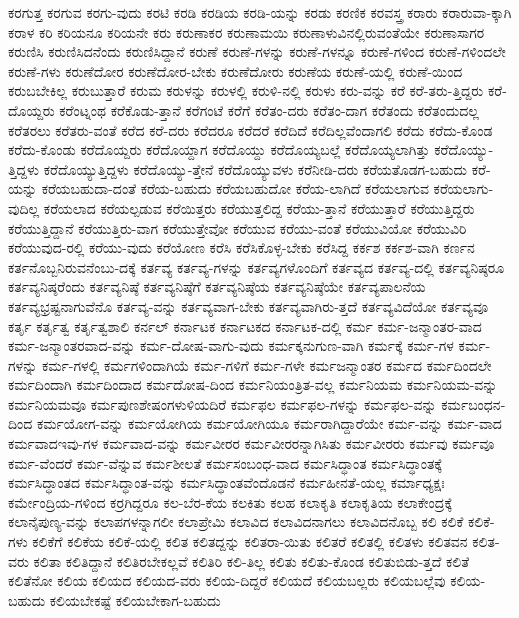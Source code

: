 {ಕರಗುತ್ತ
ಕರಗುವ
ಕರಗು-ವುದು
ಕರಟಿ
ಕರಡಿ
ಕರಡಿಯ
ಕರಡಿ-ಯನ್ನು
ಕರಡು
ಕರಣಿಕ
ಕರವಸ್ತ್ರ
ಕರಾರು
ಕರಾರುವಾ-ಕ್ಕಾಗಿ
ಕರಾಳ
ಕರಿ
ಕರಿಯನೂ
ಕರಿಯನೇ
ಕರು
ಕರುಣಾಕರ
ಕರುಣಾಮಯಿ
ಕರುಣಾಳುವಿನಲ್ಲಿರುವಂತೆಯೇ
ಕರುಣಾಸಾಗರ
ಕರುಣಿಸಿ
ಕರುಣಿಸಿದನೆಂದು
ಕರುಣಿಸಿದ್ದಾನೆ
ಕರುಣೆ
ಕರುಣೆ-ಗಳನ್ನು
ಕರುಣೆ-ಗಳನ್ನೂ
ಕರುಣೆ-ಗಳಿಂದ
ಕರುಣೆ-ಗಳಿಂದಲೇ
ಕರುಣೆ-ಗಳು
ಕರುಣೆದೋರ
ಕರುಣೆದೋರ-ಬೇಕು
ಕರುಣೆದೋರು
ಕರುಣೆಯ
ಕರುಣೆ-ಯಲ್ಲಿ
ಕರುಣೆ-ಯಿಂದ
ಕರುಬಬೇಕಿಲ್ಲ
ಕರುಬುತ್ತಾರೆ
ಕರುಮ
ಕರುಳನ್ನು
ಕರುಳಲ್ಲಿ
ಕರುಳಿ-ನಲ್ಲಿ
ಕರುಳು
ಕರು-ವನ್ನು
ಕರೆ
ಕರೆ-ತರು-ತ್ತಿದ್ದರು
ಕರೆ-ದೊಯ್ದರು
ಕರೆಂಟ್ನಂಥ
ಕರೆಕೊಡು-ತ್ತಾನೆ
ಕರೆಗಂಟೆ
ಕರೆಗೆ
ಕರೆತಂ-ದರು
ಕರೆತಂ-ದಾಗ
ಕರೆತಂದು
ಕರೆತಂದುದಲ್ಲ
ಕರೆತರಲು
ಕರೆತರು-ವಂತೆ
ಕರೆದ
ಕರೆ-ದರು
ಕರೆದರೂ
ಕರೆದರೆ
ಕರೆದಿದೆ
ಕರೆದಿಲ್ಲವೆಂದಾಗಲಿ
ಕರೆದು
ಕರೆದು-ಕೊಂಡ
ಕರೆದು-ಕೊಂಡು
ಕರೆದೊಯ್ದರು
ಕರೆದೊಯ್ದಾಗ
ಕರೆದೊಯ್ದು
ಕರೆದೊಯ್ಯಬಲ್ಲೆ
ಕರೆದೊಯ್ಯಲಾಗಿತ್ತು
ಕರೆದೊಯ್ಯು-ತ್ತಿದ್ದಳು
ಕರೆದೊಯ್ಯುತ್ತಿದ್ದಳು
ಕರೆದೊಯ್ಯು-ತ್ತೇನೆ
ಕರೆದೊಯ್ಯುವಳು
ಕರೆನೀಡಿ-ದರು
ಕರೆಯತೊಡಗ-ಬಹುದು
ಕರೆ-ಯನ್ನು
ಕರೆಯಬಹುದಾ-ದಂತೆ
ಕರೆಯ-ಬಹುದು
ಕರೆಯಬಹುದೋ
ಕರೆಯ-ಲಾಗಿದೆ
ಕರೆಯಲಾಗುವ
ಕರೆಯಲಾಗು-ವುದಿಲ್ಲ
ಕರೆಯಲಾದ
ಕರೆಯಲ್ಪಡುವ
ಕರೆಯಿತ್ತರು
ಕರೆಯುತ್ತಲಿದ್ದ
ಕರೆಯು-ತ್ತಾನೆ
ಕರೆಯುತ್ತಾರೆ
ಕರೆಯುತ್ತಿದ್ದರು
ಕರೆಯುತ್ತಿದ್ದಾನೆ
ಕರೆಯುತ್ತಿರು-ವಾಗ
ಕರೆಯುತ್ತೇವೋ
ಕರೆಯುವ
ಕರೆಯು-ವಂತೆ
ಕರೆಯುವಿಯೋ
ಕರೆಯುವಿರಿ
ಕರೆಯುವುದ-ರಲ್ಲಿ
ಕರೆಯು-ವುದು
ಕರೆಯೋಣ
ಕರೆಸಿ
ಕರೆಸಿಕೊಳ್ಳ-ಬೇಕು
ಕರೆಸಿದ್ದ
ಕರ್ಕಶ
ಕರ್ಕಶ-ವಾಗಿ
ಕರ್ಣನ
ಕರ್ತನೊಬ್ಬನಿರುವನೆಂಬು-ದಕ್ಕೆ
ಕರ್ತವ್ಯ
ಕರ್ತವ್ಯ-ಗಳನ್ನು
ಕರ್ತವ್ಯಗಳೊಂದಿಗೆ
ಕರ್ತವ್ಯದ
ಕರ್ತವ್ಯ-ದಲ್ಲಿ
ಕರ್ತವ್ಯನಿಷ್ಠರೂ
ಕರ್ತವ್ಯನಿಷ್ಠರೆಂದು
ಕರ್ತವ್ಯನಿಷ್ಠೆ
ಕರ್ತವ್ಯನಿಷ್ಠೆಗೆ
ಕರ್ತವ್ಯನಿಷ್ಠೆಯ
ಕರ್ತವ್ಯನಿಷ್ಠೆಯೇ
ಕರ್ತವ್ಯಪಾಲನೆಯ
ಕರ್ತವ್ಯಭ್ರಷ್ಟನಾಗುವೆನೊ
ಕರ್ತವ್ಯ-ವನ್ನು
ಕರ್ತವ್ಯವಾಗ-ಬೇಕು
ಕರ್ತವ್ಯವಾಗಿರು-ತ್ತದೆ
ಕರ್ತವ್ಯವಿದೆಯೋ
ಕರ್ತವ್ಯವೂ
ಕರ್ತೃ
ಕರ್ತೃತ್ವ
ಕರ್ತೃತ್ವಶಾಲಿ
ಕರ್ನಲ್
ಕರ್ನಾಟಕ
ಕರ್ನಾಟಕದ
ಕರ್ನಾಟಕ-ದಲ್ಲಿ
ಕರ್ಮ
ಕರ್ಮ-ಜನ್ಮಾಂತರ-ವಾದ
ಕರ್ಮ-ಜನ್ಮಾಂತರವಾದ-ವನ್ನು
ಕರ್ಮ-ದೋಷ-ವಾಗು-ವುದು
ಕರ್ಮಕ್ಕನುಗುಣ-ವಾಗಿ
ಕರ್ಮಕ್ಕೆ
ಕರ್ಮ-ಗಳ
ಕರ್ಮ-ಗಳನ್ನು
ಕರ್ಮ-ಗಳಲ್ಲಿ
ಕರ್ಮಗಳಿಂದಾಗಿಯೆ
ಕರ್ಮ-ಗಳಿಗೆ
ಕರ್ಮ-ಗಳೇ
ಕರ್ಮಜನ್ಮಾಂತರ
ಕರ್ಮದ
ಕರ್ಮದಿಂದಲೇ
ಕರ್ಮದಿಂದಾಗಿ
ಕರ್ಮದಿಂದಾದ
ಕರ್ಮದೋಷ-ದಿಂದ
ಕರ್ಮನಿಯಂತ್ರಿತ-ವಲ್ಲ
ಕರ್ಮನಿಯಮ
ಕರ್ಮನಿಯಮ-ವನ್ನು
ಕರ್ಮನಿಯಮವೂ
ಕರ್ಮಪುಣಶೇಷಂಗಳುಳಿಯದಿರೆ
ಕರ್ಮಫಲ
ಕರ್ಮಫಲ-ಗಳನ್ನು
ಕರ್ಮಫಲ-ವನ್ನು
ಕರ್ಮಬಂಧನ-ದಿಂದ
ಕರ್ಮಯೋಗ-ವನ್ನು
ಕರ್ಮಯೋಗಿಯ
ಕರ್ಮಯೋಗಿಯೂ
ಕರ್ಮರಾಗಿದ್ದಾರೆಯೇ
ಕರ್ಮ-ವನ್ನು
ಕರ್ಮ-ವಾದ
ಕರ್ಮವಾದಇವು-ಗಳ
ಕರ್ಮವಾದ-ವನ್ನು
ಕರ್ಮವೀರರ
ಕರ್ಮವೀರರನ್ನಾಗಿಸಿತು
ಕರ್ಮವೀರರು
ಕರ್ಮವು
ಕರ್ಮವೂ
ಕರ್ಮ-ವೆಂದರೆ
ಕರ್ಮ-ವೆನ್ನುವ
ಕರ್ಮಶೀಲತೆ
ಕರ್ಮಸಂಬಂಧ-ವಾದ
ಕರ್ಮಸಿದ್ಧಾಂತ
ಕರ್ಮಸಿದ್ಧಾಂತಕ್ಕೆ
ಕರ್ಮಸಿದ್ಧಾಂತದ
ಕರ್ಮಸಿದ್ಧಾಂತ-ವನ್ನು
ಕರ್ಮಸಿದ್ಧಾಂತವೆಂದೊಡನೆ
ಕರ್ಮಹೀನತೆ-ಯಲ್ಲ
ಕರ್ಮಾಧ್ಯಕ್ಷಃ
ಕರ್ಮೇಂದ್ರಿಯ-ಗಳಿಂದ
ಕರ್ರಗಿದ್ದರೂ
ಕಲ-ಬೆರ-ಕೆಯ
ಕಲಕಿತು
ಕಲಹ
ಕಲಾಕೃತಿ
ಕಲಾಕೃತಿಯ
ಕಲಾಕೇಂದ್ರಕ್ಕೆ
ಕಲಾನೈಪುಣ್ಯ-ವನ್ನು
ಕಲಾಪಗಳನ್ನಾಗಲೀ
ಕಲಾಪ್ರೇಮಿ
ಕಲಾವಿದ
ಕಲಾವಿದನಾಗಲು
ಕಲಾವಿದನೊಬ್ಬ
ಕಲಿ
ಕಲಿಕೆ
ಕಲಿಕೆ-ಗಳು
ಕಲಿಕೆಗೆ
ಕಲಿಕೆಯ
ಕಲಿಕೆ-ಯಲ್ಲಿ
ಕಲಿತ
ಕಲಿತದ್ದನ್ನು
ಕಲಿತರಾ-ಯಿತು
ಕಲಿತರೆ
ಕಲಿತಲ್ಲಿ
ಕಲಿತಳು
ಕಲಿತವನ
ಕಲಿತ-ವರು
ಕಲಿತಾ
ಕಲಿತಿದ್ದಾನೆ
ಕಲಿತಿರಬೇಕಲ್ಲವೆ
ಕಲಿತಿರಿ
ಕಲಿ-ತಿಲ್ಲ
ಕಲಿತು
ಕಲಿತು-ಕೊಂಡ
ಕಲಿತುಬಿಡು-ತ್ತದೆ
ಕಲಿತೆ
ಕಲಿತೆನೋ
ಕಲಿಯ
ಕಲಿಯದ
ಕಲಿಯದ-ವರು
ಕಲಿಯ-ದಿದ್ದರೆ
ಕಲಿಯದೆ
ಕಲಿಯಬಲ್ಲರು
ಕಲಿಯಬಲ್ಲೆವು
ಕಲಿಯ-ಬಹುದು
ಕಲಿಯಬೇಕಷ್ಟೆ
ಕಲಿಯಬೇಕಾಗ-ಬಹುದು
}
